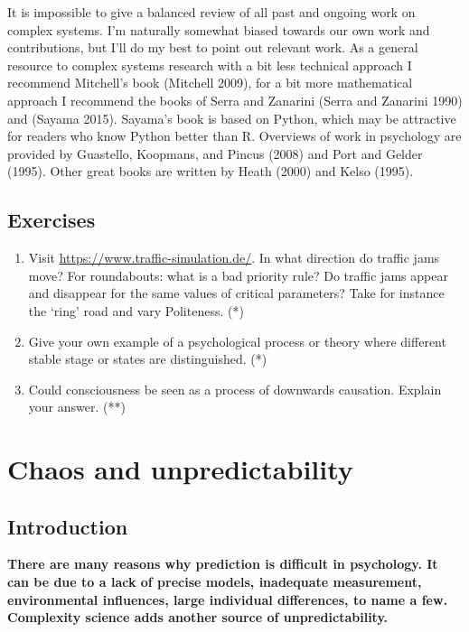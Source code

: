 \documentclass[
  letterpaper,
]{scrbook}
\begin{document}
It is impossible to give a balanced review of all past and ongoing work
on complex systems. I'm naturally somewhat biased towards our own work
and contributions, but I'll do my best to point out relevant work. As a
general resource to complex systems research with a bit less technical
approach I recommend Mitchell's book (Mitchell 2009), for a bit more
mathematical approach I recommend the books of Serra and Zanarini (Serra
and Zanarini 1990) and (Sayama 2015). Sayama's book is based on Python,
which may be attractive for readers who know Python better than R.
Overviews of work in psychology are provided by Guastello, Koopmans, and
Pincus (2008) and Port and Gelder (1995). Other great books are written
by Heath (2000) and Kelso (1995).

\hypertarget{exercises}{%
\section{Exercises}\label{exercises}}

\begin{enumerate}
\def\labelenumi{\arabic{enumi})}
\item
  Visit \url{https://www.traffic-simulation.de/}. In what direction do
  traffic jams move? For roundabouts: what is a bad priority rule? Do
  traffic jams appear and disappear for the same values of critical
  parameters? Take for instance the `ring' road and vary Politeness. (*)
\item
  Give your own example of a psychological process or theory where
  different stable stage or states are distinguished. (*)
\item
  Could consciousness be seen as a process of downwards causation.
  Explain your answer. (**)
\end{enumerate}


\hypertarget{chaos-and-unpredictability}{%
\chapter{Chaos and unpredictability}\label{chaos-and-unpredictability}}

\hypertarget{introduction-1}{%
\section{Introduction}\label{introduction-1}}

\textbf{There are many reasons why prediction is difficult in
psychology. It can be due to a lack of precise models, inadequate
measurement, environmental influences, large individual differences, to
name a few. Complexity science adds another source of unpredictability.}
\end{document}
